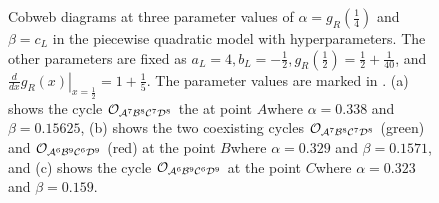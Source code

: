 \begin{figure}
	\centering
	\caption[Cobwebs of the piecewise quadratic model with hyperparameters for different values of the fixed parameters]{
	Cobweb diagrams at three parameter values of $\alpha = g_R\left(\frac{1}{4}\right)$ and $\beta = c_L$ in the piecewise quadratic model with hyperparameters.
	The other parameters are fixed as $a_L = 4, b_L = -\frac{1}{2}, g_R\left(\frac{1}{2}\right) = \frac{1}{2} + \frac{1}{40}$, and $\left. \frac{d}{dx} g_R(x) \right|_{x = \frac{1}{2}} = 1 + \frac{1}{5}$.
	The parameter values are marked in .
	(a) shows the cycle $\mathcal{O}_{\mathcal{A}^7\mathcal{B}^8\mathcal{C}^7\mathcal{D}^8}$ the at point $A$where $\alpha = 0.338$ and $\beta = 0.15625$,
	(b) shows the two coexisting cycles $\mathcal{O}_{\mathcal{A}^7\mathcal{B}^8\mathcal{C}^7\mathcal{D}^8}$ (green) and $\mathcal{O}_{\mathcal{A}^6\mathcal{B}^9\mathcal{C}^6\mathcal{D}^9}$ (red) at the point $B$where $\alpha = 0.329$ and $\beta = 0.1571$,
	and (c) shows the cycle $\mathcal{O}_{\mathcal{A}^6\mathcal{B}^9\mathcal{C}^6\mathcal{D}^9}$ at the point $C$where $\alpha = 0.323$ and $\beta = 0.159$.
	}
	\label{fig:setup.quad.hyper.2.cobwebs}
\end{figure}


